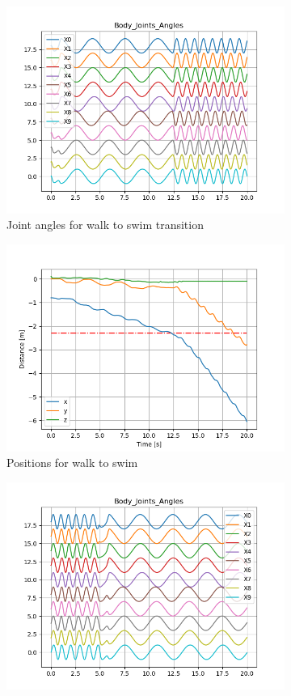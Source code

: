 \documentclass{cmc}
\begin{document}
\begin{figure}[H] 
  \begin{subfigure}[b]{0.5\linewidth}
    \centering
    \includegraphics[width=0.9\linewidth]{figures/8g_walk_to_swim.png} 
    \caption{Joint angles for walk to swim transition} 
    \label{fig:exercise8g_results:a} 
  \end{subfigure}%
  \begin{subfigure}[b]{0.5\linewidth}
    \centering
    \includegraphics[width=0.9\linewidth]{figures/8g_wts_position.png} 
    \caption{Positions for walk to swim} 
    \label{fig:exercise8g_results:b} 
  \end{subfigure}
  \begin{subfigure}[b]{0.5\linewidth}
    \centering
    \includegraphics[width=0.9\linewidth]{figures/8g_swim_to_walk.png} 

\end{subfigure}
\end{figure}
\end{document}
